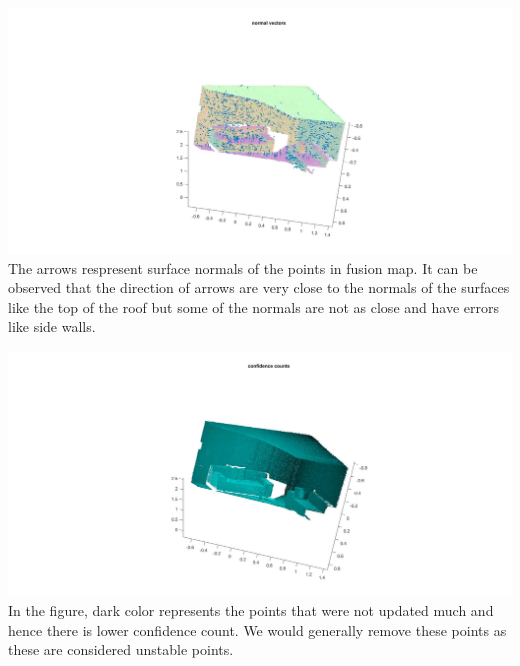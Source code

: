 \documentclass[fleqn]{article}
\begin{document}
\subsection{}
\begin{adjustwidth}{4em}{0pt}
	\includegraphics[width = 1.5\textwidth,center]{slam_hw3_q3_partc_normalVectors.jpg}\\
	The arrows respresent surface normals of the points in fusion map. It can be observed that the direction of arrows are very close to the normals of the surfaces like the top of the roof but some of the normals are not as close and have errors like side walls.
	
	\includegraphics[width = 1.5\textwidth,center]{slam_hw3_q3_partc_confidenceCounts.jpg}\\
	In the figure, dark color represents the points that were not updated much and hence there is lower confidence count. We would generally remove these points as these are considered unstable points. 
	

\end{adjustwidth}
\end{document}
